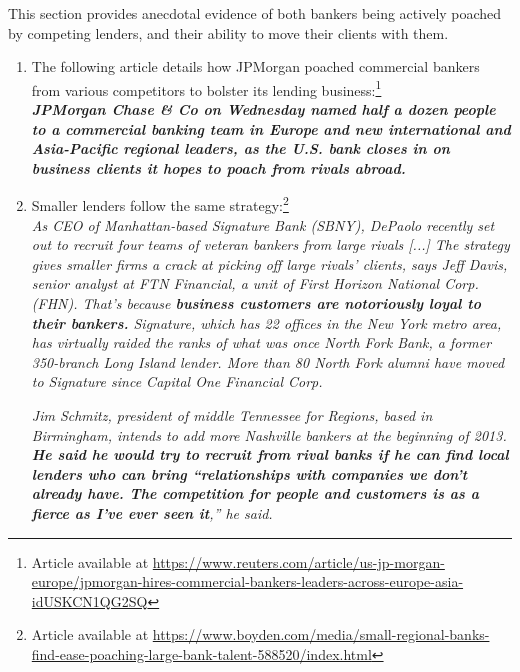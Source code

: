 

This section provides anecdotal evidence of both bankers being actively poached by competing lenders, and their ability to move their clients with them.  


\begin{enumerate}
	\item The following article details how JPMorgan poached commercial bankers from various competitors to bolster its lending business:\footnote{Article available at \url{https://www.reuters.com/article/us-jp-morgan-europe/jpmorgan-hires-commercial-bankers-leaders-across-europe-asia-idUSKCN1QG2SQ}} \\
		
	
	\textit{\textbf{JPMorgan Chase \& Co on Wednesday named half a dozen people to a commercial banking team in Europe and new international and Asia-Pacific regional leaders, as the U.S. bank closes in on business clients it hopes to poach from rivals abroad.}} %
\vspace{1em}

	\item Smaller lenders follow the same strategy:\footnote{Article available at \url{https://www.boyden.com/media/small-regional-banks-find-ease-poaching-large-bank-talent-588520/index.html}}\\
		
		\textit{As CEO of Manhattan-based Signature Bank (SBNY), DePaolo recently set out to recruit four teams of veteran bankers from large rivals [...] The strategy gives smaller firms a crack at picking off large rivals' clients, says Jeff Davis, senior analyst at FTN Financial, a unit of First Horizon National Corp. (FHN). That's because \textbf{business customers are notoriously loyal to their bankers.} Signature, which has 22 offices in the New York metro area, has virtually raided the ranks of what was once North Fork Bank, a former 350-branch Long Island lender. More than 80 North Fork alumni have moved to Signature since Capital One Financial Corp.} %
		
		
		\textit{Jim Schmitz, president of middle Tennessee for Regions, based in Birmingham, intends to add more Nashville bankers at the beginning of 2013. \textbf{He said he would try to recruit from rival banks if he can find local lenders who can bring ``relationships with companies we don't already have. The competition for people and customers is as a fierce as I've ever seen it},'' he said. }
\vspace{1em}


\end{enumerate}
